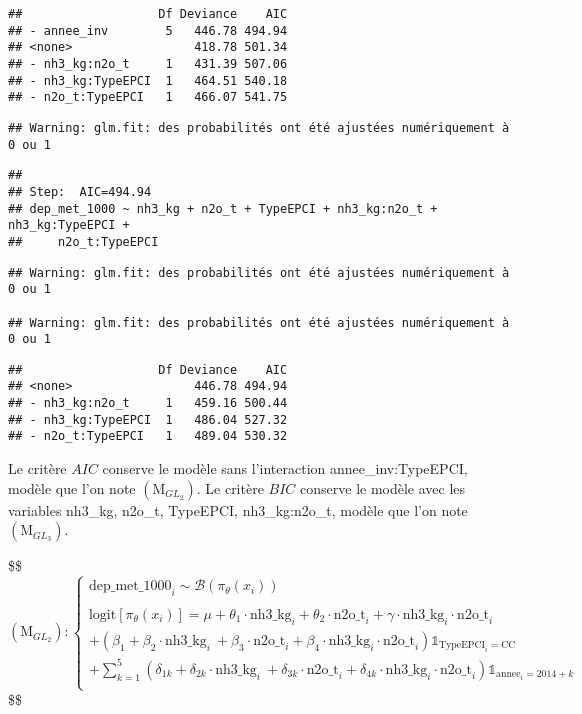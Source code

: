 \documentclass[
]{article}
\begin{document}
\begin{verbatim}
##                   Df Deviance    AIC
## - annee_inv        5   446.78 494.94
## <none>                 418.78 501.34
## - nh3_kg:n2o_t     1   431.39 507.06
## - nh3_kg:TypeEPCI  1   464.51 540.18
## - n2o_t:TypeEPCI   1   466.07 541.75
\end{verbatim}

\begin{verbatim}
## Warning: glm.fit: des probabilités ont été ajustées numériquement à 0 ou 1
\end{verbatim}

\begin{verbatim}
## 
## Step:  AIC=494.94
## dep_met_1000 ~ nh3_kg + n2o_t + TypeEPCI + nh3_kg:n2o_t + nh3_kg:TypeEPCI + 
##     n2o_t:TypeEPCI
\end{verbatim}

\begin{verbatim}
## Warning: glm.fit: des probabilités ont été ajustées numériquement à 0 ou 1

## Warning: glm.fit: des probabilités ont été ajustées numériquement à 0 ou 1
\end{verbatim}

\begin{verbatim}
##                   Df Deviance    AIC
## <none>                 446.78 494.94
## - nh3_kg:n2o_t     1   459.16 500.44
## - nh3_kg:TypeEPCI  1   486.04 527.32
## - n2o_t:TypeEPCI   1   489.04 530.32
\end{verbatim}

Le critère \(AIC\) conserve le modèle sans l'interaction
annee\_inv:TypeEPCI, modèle que l'on note \((\text{M}_{GL_{2}})\). Le
critère \(BIC\) conserve le modèle avec les variables nh3\_kg, n2o\_t,
TypeEPCI, nh3\_kg:n2o\_t, modèle que l'on note \((\text{M}_{GL_{3}})\).

\$\$ \begin{equation*}
(\text{M}_{GL_{2}}) : 

\begin{cases}
\text{dep_met_1000}_i \sim \mathcal{B}(\pi_\theta(x_i)) \\

\\

\text{logit}[\pi_\theta(x_i)] = \mu  +  \theta_1\cdot\text{nh3_kg}_i  + \theta_2\cdot\text{n2o_t}_i  +  \gamma\cdot\text{nh3_kg}_i\cdot\text{n2o_t}_i  \\ 
  + (\beta_1  +  \beta_2\cdot\text{nh3_kg}_i ~ + \beta_3\cdot\text{n2o_t}_i  + \beta_4\cdot\text{nh3_kg}_i\cdot\text{n2o_t}_i )\mathbb{1}_{\text{TypeEPCI}_i = \text{CC}} \\
  + \sum_{k=1}^5 (\delta_{1k}  +  \delta_{2k}\cdot\text{nh3_kg}_i ~ + \delta_{3k}\cdot\text{n2o_t}_i + \delta_{4k}\cdot\text{nh3_kg}_i\cdot\text{n2o_t}_i )\mathbb{1}_{\text{annee}_i = 2014 + k} \\

\end{cases}

\end{equation*} \$\$
\end{document}
